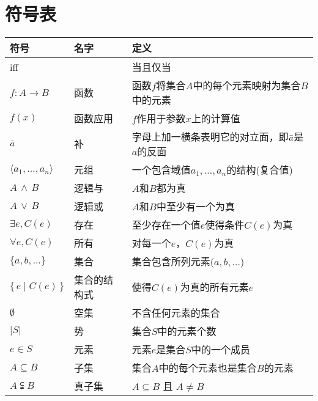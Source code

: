 \appendix
\section{符号表}
\label{sec:glossary}
\nobreak
\noindent
{}
\begin{tabu}
  to
  \toprule
\rowfont\bfseries
符号 & \normalsize 名字 & \normalsize 定义 \\
\midrule

iff & & 当且仅当 \\

$f:A\to B$ & 函数 & 函数$f$将集合$A$中的每个元素映射为集合$B$中的元素\\

$f(x)$ & 函数应用 & $f$作用于参数$x$上的计算值\\

$\bar a$ & 补 & 字母上加一横条表明它的对立面，即$\bar a$是$a$的反面\\

$\langle a_1,\ldots,a_n\rangle$ & 元组 & 一个包含域值$a_1,\ldots, a_n$的结构(复合值)\\

$A\,\wedge\, B$ & 逻辑与 & $A$和$B$都为真\\

$A\,\vee\, B$ & 逻辑或 & $A$和$B$中至少有一个为真\\

$\exists e,C(e)$ & 存在 & 至少存在一个值$e$使得条件$C(e)$为真\\

$\forall e,C(e)$ & 所有 & 对每一个$e$，$C(e)$为真\\

$\{a, b, \ldots\}$ & 集合 & 集合包含所列元素($a,b,\ldots$) \\

$\{\,e \mid C(e)\,\}$ & 集合的结构式 &使得$C(e)$为真的所有元素$e$\\

$\emptyset$ & 空集 & 不含任何元素的集合 \\

$\lvert S\rvert$ & 势 & 集合$S$中的元素个数 \\

$e\in S$ & 元素 & 元素$e$是集合$S$中的一个成员 \\

$A\subseteq B$ & 子集 & 集合$A$中的每个元素也是集合$B$的元素\\

$A\subsetneqq B$ & 真子集 & $A\subseteq B$ 且 $A\ne B$\\


\end{tabu}
